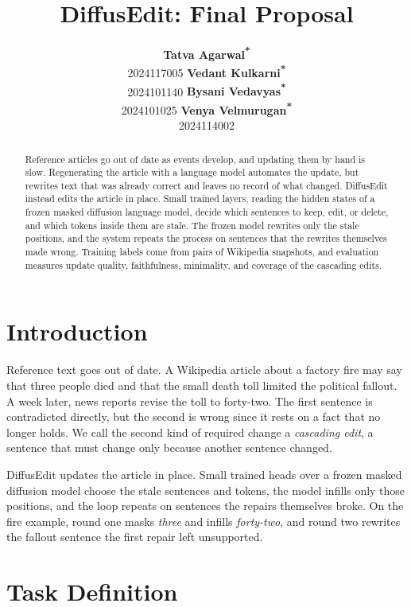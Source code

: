 \documentclass[11pt]{article}
\title{DiffusEdit: Final Proposal}
\author{
  \textbf{Tatva Agarwal\textsuperscript{*}} \\ 2024117005 \And
  \textbf{Vedant Kulkarni\textsuperscript{*}} \\ 2024101140 \And
  \textbf{Bysani Vedavyas\textsuperscript{*}} \\ 2024101025 \And
  \textbf{Venya Velmurugan\textsuperscript{*}} \\ 2024114002
}
\begin{document}
\maketitle

\renewcommand{\thefootnote}{\fnsymbol{footnote}}
\renewcommand{\thefootnote}{\arabic{footnote}}
\setcounter{footnote}{0}

\begin{abstract}
Reference articles go out of date as events develop, and updating them by hand is slow. Regenerating the article with a language model automates the update, but rewrites text that was already correct and leaves no record of what changed. DiffusEdit instead edits the article in place. Small trained layers, reading the hidden states of a frozen masked diffusion language model, decide which sentences to keep, edit, or delete, and which tokens inside them are stale. The frozen model rewrites only the stale positions, and the system repeats the process on sentences that the rewrites themselves made wrong. Training labels come from pairs of Wikipedia snapshots, and evaluation measures update quality, faithfulness, minimality, and coverage of the cascading edits.
\end{abstract}

\section{Introduction}
\label{sec:intro}

Reference text goes out of date. A Wikipedia article about a factory fire may say that three people died and that the small death toll limited the political fallout. A week later, news reports revise the toll to forty-two. The first sentence is contradicted directly, but the second is wrong since it rests on a fact that no longer holds. We call the second kind of required change a \emph{cascading edit}, a sentence that must change only because another sentence changed.

DiffusEdit updates the article in place. Small trained heads over a frozen masked diffusion model choose the stale sentences and tokens, the model infills only those positions, and the loop repeats on sentences the repairs themselves broke. On the fire example, round one masks \emph{three} and infills \emph{forty-two}, and round two rewrites the fallout sentence the first repair left unsupported.

\section{Task Definition}
\label{sec:problem}
\end{document}
